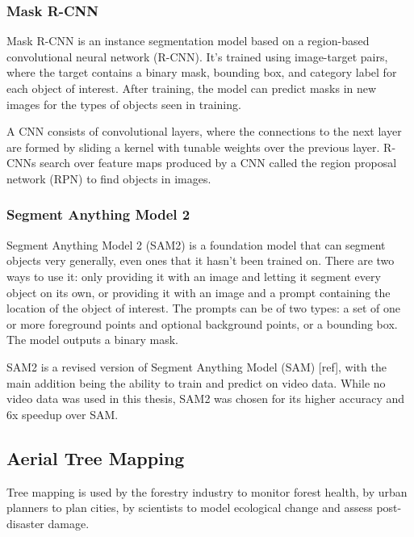 \documentclass[english, 12pt, a4paper, sci, utf8, a-2b, online]{aaltothesis}
\begin{document}
\subsubsection{Mask R-CNN}

Mask R-CNN is an instance segmentation model based on a region-based convolutional neural network (R-CNN). It's trained using image-target pairs, where the target contains a binary mask, bounding box, and category label for each object of interest. After training, the model can predict masks in new images for the types of objects seen in training.

A CNN consists of convolutional layers, where the connections to the next layer are formed by sliding a kernel with tunable weights over the previous layer. R-CNNs search over feature maps produced by a CNN called the region proposal network (RPN) to find objects in images.
\newline
{}
\newline

\subsubsection{Segment Anything Model 2}

Segment Anything Model 2 (SAM2) is a foundation model that can segment objects very generally, even ones that it hasn't been trained on. There are two ways to use it: only providing it with an image and letting it segment every object on its own, or providing it with an image and a prompt containing the location of the object of interest. The prompts can be of two types: a set of one or more foreground points and optional background points, or a bounding box. The model outputs a binary mask.
\newline
{}
\newline

SAM2 is a revised version of Segment Anything Model (SAM) [ref], with the main addition being the ability to train and predict on video data. While no video data was used in this thesis, SAM2 was chosen for its higher accuracy and 6x speedup over SAM.

\subsection{Aerial Tree Mapping}

Tree mapping is used by the forestry industry to monitor forest health, by urban planners to plan cities, by scientists to model ecological change and assess post-disaster damage.
\end{document}
